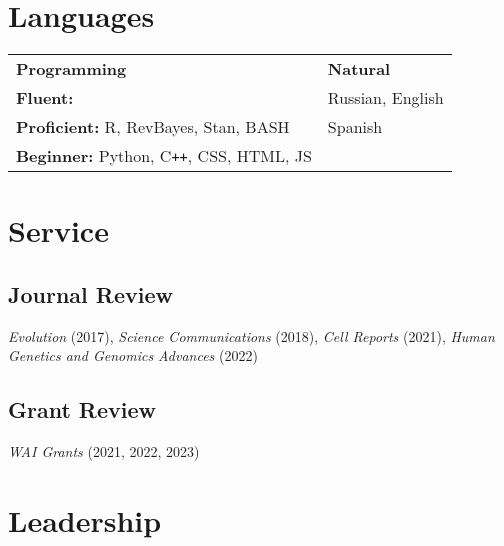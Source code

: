 \documentclass[12pt]{article}
\begin{document}
\section{Languages}

\noindent\begin{tabular}{@{}ll}
\hspace{2cm} \textbf{Programming}         & \hspace{3cm}                          \textbf{Natural}\\
\textbf{Fluent:} & \hspace{3cm} Russian, English\\
\textbf{Proficient:} R, RevBayes, Stan, BASH &  \hspace{3cm} Spanish\\
\textbf{Beginner:}  \hspace{0.035cm} Python, C\texttt{++}, CSS, HTML, JS &  \hspace{3cm} \\
\end{tabular}


\section{Service}

\subsection{Journal Review}

\emph{Evolution} (2017),  \emph{Science Communications} (2018),  \emph{Cell Reports} (2021), \emph{Human Genetics and Genomics Advances} (2022)

\subsection{Grant Review}

\emph{WAI Grants} (2021,  2022,  2023)

\section{Leadership}
\end{document}
